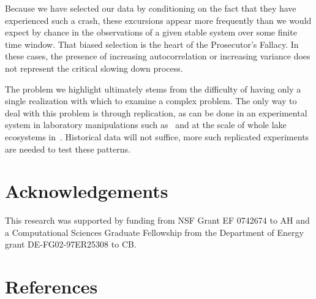 \documentclass[authoryear,review,12pt]{elsarticle}
\begin{document}
Because we have selected our data by conditioning
on the fact that they have experienced such a crash, these excursions appear
more frequently than we would expect by chance in the observations of a given
stable system over some finite time window.  That biased selection is the
heart of the Prosecutor's Fallacy.  In these cases, the presence of increasing
autocorrelation or increasing variance does not represent the critical slowing
down process.

The problem we highlight ultimately stems from the difficulty of having only a
single realization with which to examine a complex problem.  The only way to deal
with this problem is through replication, as can be done in an experimental system
in laboratory manipulations such as~\citet{Drake2010, Veraart2011} and at the 
scale of whole lake ecosystems in~\citet{Carpenter2011}.  Historical data will 
not suffice, more such replicated experiments are needed to test these patterns.  


 \section{Acknowledgements}
This research was supported by funding from NSF Grant EF 0742674 to AH
and a Computational Sciences Graduate Fellowship from the Department of Energy grant DE-FG02-97ER25308 to CB. 
 \section{References}%
 
 
\end{document}
